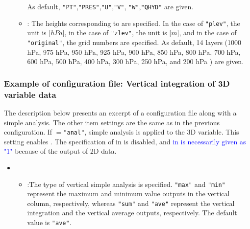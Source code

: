 \begin{itemize}
\begin{itemize}
    As default, \verb|"PT"|,\verb|"PRES"|,\verb|"U"|,\verb|"V"|, \verb|"W"|,\verb|"QHYD"| are given.
  \item {}: The heights corresponding to  are specified.
    In the case of \verb|"plev"|, the unit is [$hPa$],
    in the case of \verb|"zlev"|, the unit is [$m$], and
    in the case of \verb|"original"|, the grid numbers are specified.
    As default, 14 layers (1000 hPa, 975 hPa, 950 hPa, 925 hPa, 900 hPa, 850 hPa, 800 hPa, 700 hPa, 600 hPa, 500 hPa, 400 hPa,
        300 hPa, 250 hPa, and 200 hPa ) are given.
 \end{itemize}
\end{itemize}

\subsubsection{Example of configuration file: Vertical integration of 3D variable data}
The description below presents an excerpt of a configuration file along with a simple analysis.
The other item settings are the same as in the previous configuration.
If $=$\verb|"anal"|, simple analysis is applied to the 3D variable.
This setting enables .
The specification of  in  is disabled,
and \textcolor{blue}{ in  is necessarily given as "1"}
because of the output of 2D data.
\begin{itemize}
 \item {}
 \begin{itemize}
  \item {}:The type of vertical simple analysis is specified. \verb|"max"| and \verb|"min"|
    represent the maximum and minimum value outputs in the vertical column, respectively, whereas \verb|"sum"| and \verb|"ave"| represent
    the vertical integration and the vertical average outputs, respectively. The default value is \verb|"ave"|.
 \end{itemize}
\end{itemize}

